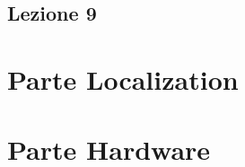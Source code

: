 \documentclass[oneside, 12pt]{extbook}
\begin{document}
\chapter{Lezione 9}

















\part{Parte Localization}








\part{Parte Hardware}
\end{document}
